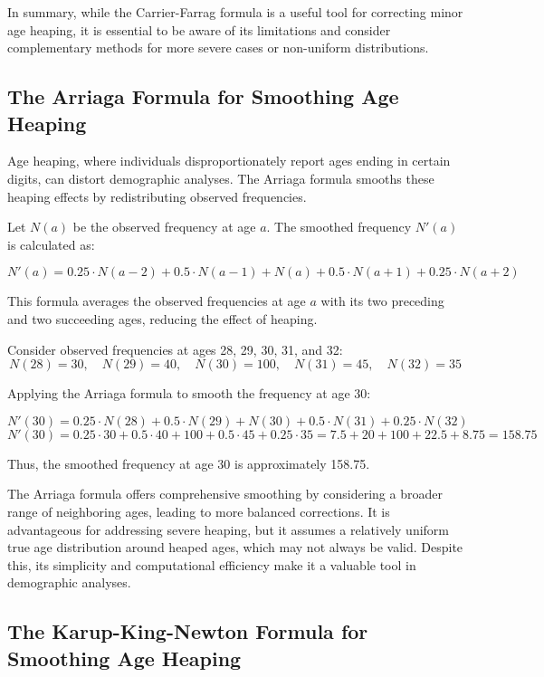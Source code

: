 \documentclass[pdflatex,sn-mathphys-num]{sn-jnl}%
\theoremstyle{thmstyleone}%
\theoremstyle{thmstyletwo}%
\theoremstyle{thmstylethree}%
\begin{document}
In summary, while the Carrier-Farrag formula is a useful tool for correcting minor age heaping, it is essential to be aware of its limitations and consider complementary methods for more severe cases or non-uniform distributions.


\subsection{The Arriaga Formula for Smoothing Age Heaping}

Age heaping, where individuals disproportionately report ages ending in certain digits, can distort demographic analyses. The Arriaga formula \citep{arriaga1968} smooths these heaping effects by redistributing observed frequencies.

Let \( N(a) \) be the observed frequency at age \( a \). The smoothed frequency \( N'(a) \) is calculated as:

\[
N'(a) = 0.25 \cdot N(a-2) + 0.5 \cdot N(a-1) + N(a) + 0.5 \cdot N(a+1) + 0.25 \cdot N(a+2)
\]

This formula averages the observed frequencies at age \( a \) with its two preceding and two succeeding ages, reducing the effect of heaping.


Consider observed frequencies at ages 28, 29, 30, 31, and 32:
\[
N(28) = 30, \quad N(29) = 40, \quad N(30) = 100, \quad N(31) = 45, \quad N(32) = 35
\]

Applying the Arriaga formula to smooth the frequency at age 30:

\[
N'(30) = 0.25 \cdot N(28) + 0.5 \cdot N(29) + N(30) + 0.5 \cdot N(31) + 0.25 \cdot N(32)
\]
\[
N'(30) = 0.25 \cdot 30 + 0.5 \cdot 40 + 100 + 0.5 \cdot 45 + 0.25 \cdot 35 = 7.5 + 20 + 100 + 22.5 + 8.75 = 158.75
\]

Thus, the smoothed frequency at age 30 is approximately 158.75.


The Arriaga formula offers comprehensive smoothing by considering a broader range of neighboring ages, leading to more balanced corrections. It is advantageous for addressing severe heaping, but it assumes a relatively uniform true age distribution around heaped ages, which may not always be valid. Despite this, its simplicity and computational efficiency make it a valuable tool in demographic analyses.



\subsection{The Karup-King-Newton Formula for Smoothing Age Heaping}
\end{document}
